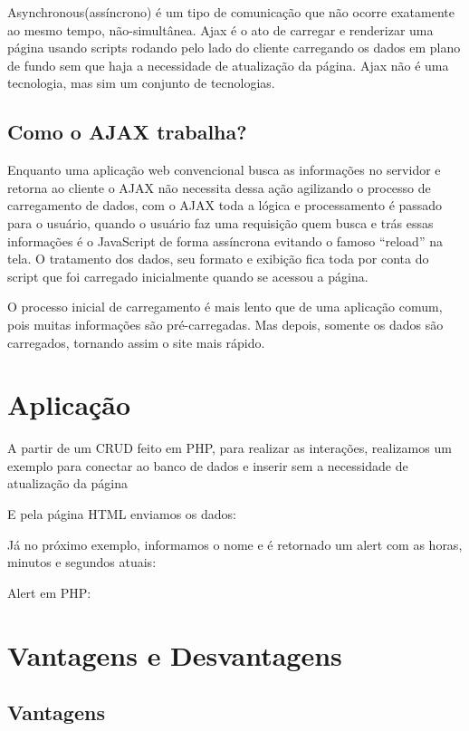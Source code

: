 \documentclass[12pt,a4paper]{article}
\begin{document}
Asynchronous(assíncrono) é um tipo de comunicação que não ocorre exatamente ao mesmo tempo, não-simultânea. Ajax é o ato de carregar e renderizar uma página usando scripts rodando pelo lado do cliente carregando os dados em plano de fundo sem que haja a necessidade de atualização da página. Ajax não é uma tecnologia, mas sim um conjunto de tecnologias.

\subsection{Como o AJAX trabalha?}

Enquanto uma aplicação web convencional busca as informações no servidor e retorna ao cliente o AJAX não necessita dessa ação agilizando o processo de carregamento de dados, com o AJAX  toda a lógica e processamento é passado para o usuário, quando o usuário faz uma requisição quem busca e trás essas informações é o JavaScript de forma assíncrona evitando o famoso “reload” na tela. O tratamento dos dados, seu formato e exibição fica toda por conta do script que foi carregado inicialmente quando se acessou a página.

O processo inicial de carregamento é mais lento que de uma aplicação comum, pois muitas informações são pré-carregadas. Mas depois, somente os dados são carregados, tornando assim o site mais rápido.

\section{Aplicação}
A partir de um CRUD feito em PHP, para realizar as interações, realizamos um exemplo para conectar ao banco de dados e inserir sem a necessidade de atualização da página


E pela página HTML enviamos os dados:

 
Já no próximo exemplo, informamos o nome e é retornado um alert com as horas, minutos e segundos atuais:

Alert em PHP:




\section{Vantagens e Desvantagens}
\subsection{Vantagens}
\end{document}
